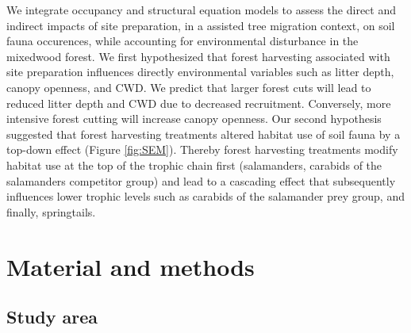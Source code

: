 We integrate occupancy and structural equation models to assess the direct and indirect impacts of site preparation, in a assisted tree migration context, 
on soil fauna occurences, while accounting for environmental disturbance in the mixedwood forest.
We first hypothesized that forest harvesting associated with site preparation influences directly environmental variables such as litter depth, canopy openness, and CWD. 
We predict that larger forest cuts will lead to reduced litter depth and CWD due to decreased recruitment. 
Conversely, more intensive forest cutting will increase canopy openness. 
Our second hypothesis suggested that forest harvesting treatments altered habitat use of soil fauna by a top-down effect (Figure \ref*{fig:SEM}). 
Thereby forest harvesting treatments modify habitat use at the top of the trophic chain first (salamanders, carabids of the salamanders competitor group) and lead to 
a cascading effect that subsequently influences lower trophic levels such as carabids of the salamander prey group, and finally, springtails.


\section*{Material and methods}
\label{sec:matmet1}

\subsection*{Study area}
\label{subsec:area}

